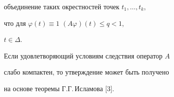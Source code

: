 объединение таких окрестностей точек $t_1,\dotsc,t_k$,


что для $\varphi(t)\equiv 1$\; $(A\varphi)(t)\leq q<1$,


$t\in\Delta$.





\begin{note}


Если удовлетворяющий условиям следствия оператор $A$


слабо компактен, то утверждение может быть получено


на основе теоремы Г.Г.\,Исламова [3].


\end{note}





